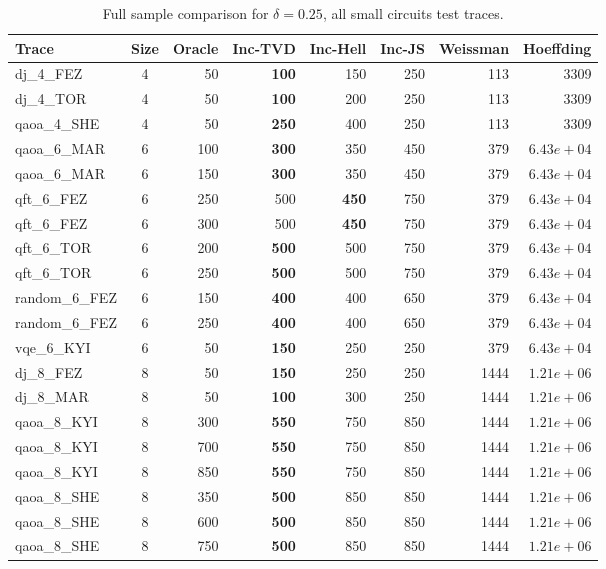 \begin{table}[ht!]
\centering
\footnotesize
\setlength{\tabcolsep}{3pt}
\renewcommand{\arraystretch}{1.05}
\caption{Full sample comparison for $\delta = 0.25$, all small circuits test traces.}
\label{tab:appendix-sota-d025-s}
\begin{tabular}{l c r r r r r r}
\toprule
Trace & Size & Oracle & Inc-TVD & Inc-Hell & Inc-JS & Weissman & Hoeffding \\
\midrule
dj\_4\_FEZ & 4 & 50 & \textbf{100} & 150 & 250 & 113 & 3309 \\
dj\_4\_TOR & 4 & 50 & \textbf{100} & 200 & 250 & 113 & 3309 \\
qaoa\_4\_SHE & 4 & 50 & \textbf{250} & 400 & 250 & 113 & 3309 \\
qaoa\_6\_MAR & 6 & 100 & \textbf{300} & 350 & 450 & 379 & $6.43e+04$ \\
qaoa\_6\_MAR & 6 & 150 & \textbf{300} & 350 & 450 & 379 & $6.43e+04$ \\
qft\_6\_FEZ & 6 & 250 & 500 & \textbf{450} & 750 & 379 & $6.43e+04$ \\
qft\_6\_FEZ & 6 & 300 & 500 & \textbf{450} & 750 & 379 & $6.43e+04$ \\
qft\_6\_TOR & 6 & 200 & \textbf{500} & 500 & 750 & 379 & $6.43e+04$ \\
qft\_6\_TOR & 6 & 250 & \textbf{500} & 500 & 750 & 379 & $6.43e+04$ \\
random\_6\_FEZ & 6 & 150 & \textbf{400} & 400 & 650 & 379 & $6.43e+04$ \\
random\_6\_FEZ & 6 & 250 & \textbf{400} & 400 & 650 & 379 & $6.43e+04$ \\
vqe\_6\_KYI & 6 & 50 & \textbf{150} & 250 & 250 & 379 & $6.43e+04$ \\
dj\_8\_FEZ & 8 & 50 & \textbf{150} & 250 & 250 & 1444 & $1.21e+06$ \\
dj\_8\_MAR & 8 & 50 & \textbf{100} & 300 & 250 & 1444 & $1.21e+06$ \\
qaoa\_8\_KYI & 8 & 300 & \textbf{550} & 750 & 850 & 1444 & $1.21e+06$ \\
qaoa\_8\_KYI & 8 & 700 & \textbf{550} & 750 & 850 & 1444 & $1.21e+06$ \\
qaoa\_8\_KYI & 8 & 850 & \textbf{550} & 750 & 850 & 1444 & $1.21e+06$ \\
qaoa\_8\_SHE & 8 & 350 & \textbf{500} & 850 & 850 & 1444 & $1.21e+06$ \\
qaoa\_8\_SHE & 8 & 600 & \textbf{500} & 850 & 850 & 1444 & $1.21e+06$ \\
qaoa\_8\_SHE & 8 & 750 & \textbf{500} & 850 & 850 & 1444 & $1.21e+06$ \\

\end{tabular}
\end{table}
